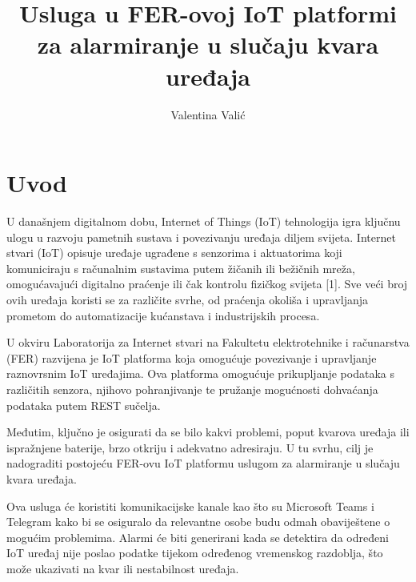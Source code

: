 \documentclass[times, utf8, zavrsni]{fer}
\begin{document}

\title{Usluga u FER-ovoj IoT platformi za alarmiranje u slučaju kvara uređaja}

\author{Valentina Valić}

\maketitle




\tableofcontents

\chapter{Uvod}

U današnjem digitalnom dobu, Internet of Things (IoT) tehnologija igra ključnu ulogu u razvoju pametnih sustava i povezivanju uređaja diljem svijeta. Internet stvari (IoT) opisuje uređaje ugrađene s senzorima i aktuatorima koji komuniciraju s računalnim sustavima putem žičanih ili bežičnih mreža, omogućavajući digitalno praćenje ili čak kontrolu fizičkog svijeta [1]. Sve veći broj ovih uređaja koristi se za različite svrhe, od praćenja okoliša i upravljanja prometom do automatizacije kućanstava i industrijskih procesa.

U okviru Laboratorija za Internet stvari na Fakultetu elektrotehnike i računarstva (FER) razvijena je IoT platforma koja omogućuje povezivanje i upravljanje raznovrsnim IoT uređajima. Ova platforma omogućuje prikupljanje podataka s različitih senzora, njihovo pohranjivanje te pružanje mogućnosti dohvaćanja podataka putem REST sučelja.

Međutim, ključno je osigurati da se bilo kakvi problemi, poput kvarova uređaja ili ispražnjene baterije, brzo otkriju i adekvatno adresiraju. U tu svrhu, cilj je nadograditi postojeću FER-ovu IoT platformu uslugom za alarmiranje u slučaju kvara uređaja.

Ova usluga će koristiti komunikacijske kanale kao što su Microsoft Teams i Telegram kako bi se osiguralo da relevantne osobe budu odmah obaviještene o mogućim problemima. Alarmi će biti generirani kada se detektira da određeni IoT uređaj nije poslao podatke tijekom određenog vremenskog razdoblja, što može ukazivati na kvar ili nestabilnost uređaja.
\end{document}
